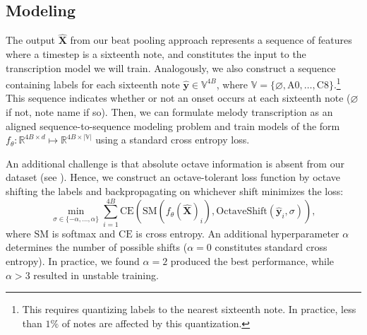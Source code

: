 \subsection{Modeling}

The output $\hat{\bm{X}}$ from our beat pooling approach represents a sequence of features where a timestep is a sixteenth note, and constitutes the input to the transcription model we will train. 
Analogously, we also construct a sequence containing labels for each sixteenth note ${\hat{\bm{y}} \in \mathbb{V}^{4B}}$, where 
${\mathbb{V} = \{\varnothing, \text{A0}, \ldots, \text{C8}\}}$.\footnote{This requires quantizing labels to the nearest sixteenth note. In practice, less than $1\%$ of notes are affected by this quantization.
} 
This sequence indicates whether or not an onset occurs at each sixteenth note ($\varnothing$ if not, note name if so). 
Then, we can formulate melody transcription as an aligned sequence-to-sequence modeling problem and train models of the form ${f_{\theta} : \mathbb{R}^{4B \times d} \mapsto \mathbb{R}^{4B \times |\mathbb{V}|}}$ using a standard cross entropy loss. 

An additional challenge is that absolute octave information is absent from our dataset (see ). 
Hence, we construct an octave-tolerant loss function by octave shifting the labels and backpropagating on whichever shift minimizes the loss:
\begin{equation*}
\operatorname*{min}_{\sigma \in \{-\alpha, \ldots, \alpha\}} \sum_{i=1}^{4B} \text{CE}(\text{SM}(f_{\theta}(\bm{\hat{X}})_i), \text{OctaveShift}(\hat{\bm{y}}_i, \sigma)), 
\end{equation*}
where $\text{SM}$ is softmax and $\text{CE}$ is cross entropy. 
An additional hyperparameter $\alpha$ determines the number of possible shifts (${\alpha = 0}$ constitutes standard cross entropy). 
In practice, we found ${\alpha = 2}$ produced the best performance, 
while ${\alpha > 3}$ resulted in unstable training.

